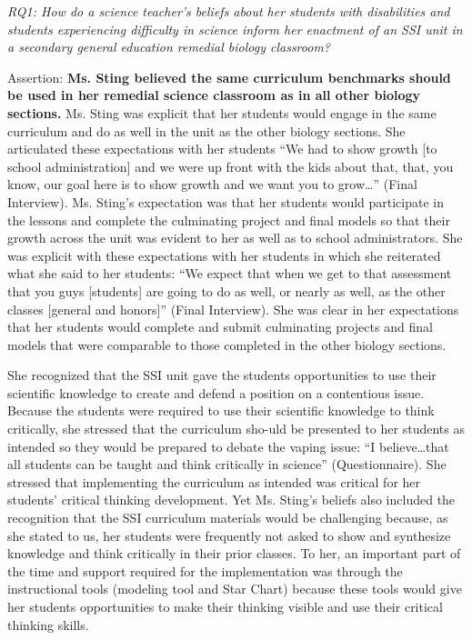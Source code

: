 \documentclass[11.5pt]{sig-alternate}
\begin{document}
\begin{large}
\textit{RQ1: How do a science teacher’s beliefs about her students with disabilities and students experiencing difficulty in science inform her enactment of an SSI unit in a secondary general education remedial biology classroom?}

Assertion: \textbf{Ms. Sting believed the same curriculum benchmarks should be used in her remedial science classroom as in all other biology sections.} Ms. Sting was explicit that her students would engage in the same curriculum and do as well in the unit as the other biology sections. She articulated these expectations with her students “We had to show growth [to school administration] and we were up front with the kids about that, that, you know, our goal here is to show growth and we want you to grow…” (Final Interview). Ms. Sting’s expectation was that her students would participate in the lessons and complete the culminating project and final models so that their growth across the unit was evident to her as well as to school administrators. She was explicit with these expectations with her students in which she reiterated what she said to her students: “We expect that when we get to that assessment that you guys [students] are going to do as well, or nearly as well, as the other classes [general and honors]” (Final Interview). She was clear in her expectations that her students would complete and submit culminating projects and final models that were comparable to those completed in the other biology sections.

She recognized that the SSI unit gave the students opportunities to use their scientific knowledge to create and defend a position on a contentious issue. Because the students were required to use their scientific knowledge to think critically, she stressed that the curriculum sho-uld be presented to her students as intended so they would be prepared to debate the vaping issue: “I believe…that all students can be taught and think critically in science” (Questionnaire). She stressed that implementing the curriculum as intended was critical for her students’ critical thinking development. Yet Ms. Sting’s beliefs also included the recognition that the SSI curriculum materials would be challenging because, as she stated to us, her students were frequently not asked to show and synthesize knowledge and think critically in their prior classes. To her, an important part of the time and support required for the implementation was through the instructional tools (modeling tool and Star Chart) because these tools would give her students opportunities to make their thinking visible and use their critical thinking skills.


\end{large}
\end{document}

